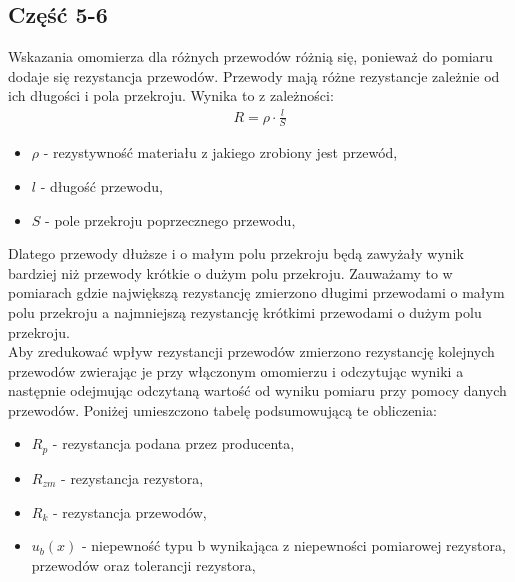 \documentclass[11pt]{article}
\begin{document}
    \subsection*{Część 5-6}
    Wskazania omomierza dla różnych przewodów różnią się, ponieważ do pomiaru dodaje się rezystancja przewodów.
    Przewody mają różne rezystancje zależnie od ich długości i pola przekroju. Wynika to z zależności:
    \begin{gather*}
        R=\rho\cdot\frac{l}{S}
    \end{gather*}
    {\footnotesize
        \begin{itemize}
            \setlength\itemsep{0em}
            \item[] \boldmath$\rho$ - rezystywność materiału z jakiego zrobiony jest przewód,
            \item[] \boldmath$l$ - długość przewodu,
            \item[] \boldmath$S$ - pole przekroju poprzecznego przewodu,
        \end{itemize}}
    Dlatego przewody dłuższe i o małym polu przekroju będą zawyżały wynik bardziej niż przewody krótkie o dużym polu przekroju.
    Zauważamy to w pomiarach gdzie największą rezystancję zmierzono długimi przewodami o małym polu przekroju a najmniejszą
    rezystancję krótkimi przewodami o dużym polu przekroju.\\
    Aby zredukować wpływ rezystancji przewodów zmierzono rezystancję kolejnych przewodów zwierając je przy włączonym omomierzu
    i odczytując wyniki a następnie odejmując odczytaną wartość od wyniku pomiaru przy pomocy danych przewodów.
    Poniżej umieszczono tabelę podsumowującą te obliczenia:
    \begin{center}
    \end{center}
    {\footnotesize
        \begin{itemize}
            \setlength\itemsep{0em}
            \item[] \boldmath$R_p$ - rezystancja podana przez producenta,
            \item[] \boldmath$R_{zm}$ - rezystancja rezystora,
            \item[] \boldmath$R_k$ - rezystancja przewodów,
            \item[] \boldmath$u_b(x)$ - niepewność typu b wynikająca z niepewności pomiarowej rezystora, przewodów oraz tolerancji rezystora,
        \end{itemize}}
\end{document}
